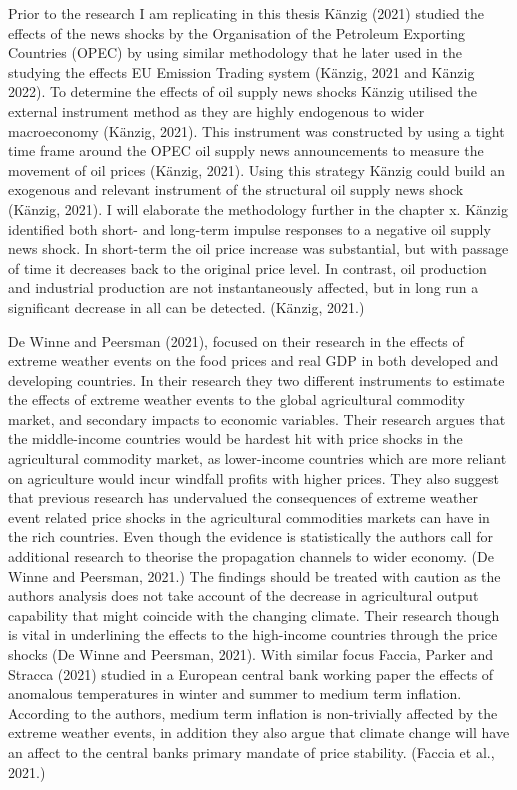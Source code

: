 \documentclass[
  12pt,
  a4paper,
]{report}
\begin{document}
Prior to the research I am replicating in this thesis Känzig (2021) studied the effects of the news shocks by the Organisation of the Petroleum Exporting Countries (OPEC) by using similar methodology that he later used in the studying the effects EU Emission Trading system (Känzig, 2021 and Känzig 2022). To determine the effects of oil supply news shocks Känzig utilised the external instrument method as they are highly endogenous to wider macroeconomy (Känzig, 2021). This instrument was constructed by using a tight time frame around the OPEC oil supply news announcements to measure the movement of oil prices (Känzig, 2021). Using this strategy Känzig could build an exogenous and relevant instrument of the structural oil supply news shock (Känzig, 2021). I will elaborate the methodology further in the chapter x. Känzig identified both short- and long-term impulse responses to a negative oil supply news shock. In short-term the oil price increase was substantial, but with passage of time it decreases back to the original price level. In contrast, oil production and industrial production are not instantaneously affected, but in long run a significant decrease in all can be detected. (Känzig, 2021.)

De Winne and Peersman (2021), focused on their research in the effects of extreme weather events on the food prices and real GDP in both developed and developing countries. In their research they two different instruments to estimate the effects of extreme weather events to the global agricultural commodity market, and secondary impacts to economic variables. Their research argues that the middle-income countries would be hardest hit with price shocks in the agricultural commodity market, as lower-income countries which are more reliant on agriculture would incur windfall profits with higher prices. They also suggest that previous research has undervalued the consequences of extreme weather event related price shocks in the agricultural commodities markets can have in the rich countries. Even though the evidence is statistically the authors call for additional research to theorise the propagation channels to wider economy. (De Winne and Peersman, 2021.) The findings should be treated with caution as the authors analysis does not take account of the decrease in agricultural output capability that might coincide with the changing climate. Their research though is vital in underlining the effects to the high-income countries through the price shocks (De Winne and Peersman, 2021). With similar focus Faccia, Parker and Stracca (2021) studied in a European central bank working paper the effects of anomalous temperatures in winter and summer to medium term inflation. According to the authors, medium term inflation is non-trivially affected by the extreme weather events, in addition they also argue that climate change will have an affect to the central banks primary mandate of price stability. (Faccia et al., 2021.)
\end{document}
